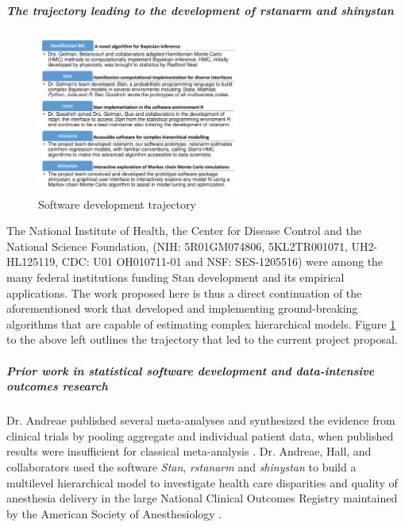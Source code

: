 \documentclass[11pt,notitlepage]{article}
\begin{document}
\subparagraph*{The trajectory leading to the development of \textit{rstanarm} and \textit{shinystan}} 

\begin{figure} 
 \vspace{- 15pt}
    \centering
\includegraphics[width=0.6\textwidth]{Figures/SoftwareTrajectory.pdf}
  \vspace{-32pt}
  \caption{Software development trajectory}
    \label{fig:trajectory}
 \vspace{- 15pt}
\end{figure}

The National Institute of Health, the Center for Disease Control and the National Science Foundation, 
(NIH: 5R01GM074806, 5KL2TR001071, UH2-HL125119,  CDC: U01 OH010711-01 and NSF: SES-1205516) were among the many 
federal institutions funding Stan \cite{Stan-manual:2015} development and its empirical applications.
The work proposed here is thus a direct continuation of the aforementioned work that developed and implementing 
ground-breaking algorithms that are capable of estimating complex hierarchical models. Figure \ref{fig:trajectory} to the above left 
outlines the trajectory that led to the current project proposal.

\subparagraph*{Prior work in statistical software development and data-intensive outcomes research}
 
Dr. Andreae published several meta-analyses and synthesized the evidence 
from clinical trials by pooling aggregate and individual patient data, when 
published results were insufficient for classical meta-analysis 
\cite{AndreaeJohnsonAbstract2013, Andreae2013, Andreae2015, Carter2015, Atchabahian2015}. Dr. Andreae, Hall, and 
collaborators used the software \textit{Stan}, \textit{rstanarm} and \textit{shinystan} to build a multilevel 
hierarchical model to investigate health care disparities and quality of 
anesthesia delivery in the large National Clinical Outcomes Registry maintained 
by the American Society of Anesthesiology \cite{AndreaeWhite2015}. 
\end{document}
